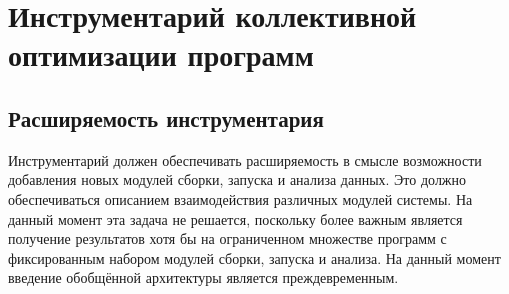 \section{Инструментарий коллективной оптимизации программ}
\subsection{Расширяемость инструментария}
Инструментарий должен обеспечивать расширяемость в смысле возможности добавления новых модулей сборки, запуска и анализа данных. Это должно обеспечиваться описанием взаимодействия различных модулей системы. На данный момент эта задача не решается, поскольку более важным является получение результатов хотя бы на ограниченном множестве программ с фиксированным набором модулей сборки, запуска и анализа. На данный момент введение обобщённой архитектуры является преждевременным.
